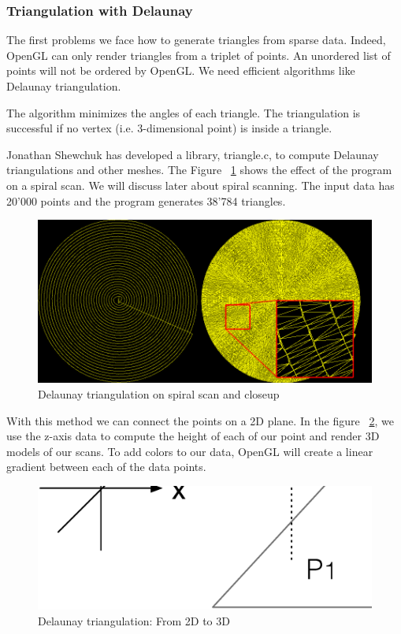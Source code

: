 \subsubsection{Triangulation with Delaunay}

The first problems we face how to generate triangles from sparse data. Indeed, OpenGL can only render triangles from a triplet of points. An unordered list of points will not be ordered by OpenGL. We need efficient algorithms like Delaunay triangulation.

The algorithm minimizes the angles of each triangle. The triangulation is successful if no vertex (i.e. 3-dimensional point) is inside a triangle.

Jonathan Shewchuk \cite{shewchuk96b} has developed a library, triangle.c, to compute Delaunay triangulations and other meshes. The Figure ~\ref{triangulation2d} shows the effect of the program on a spiral scan.  We will discuss later about spiral scanning. The input data has 20'000 points and the program generates 38'784 triangles. 

\begin{figure}[H]
  \centering
  \includegraphics[scale=0.5]{images/triangulation.png}
    \caption{Delaunay triangulation on spiral scan and closeup}
  \label{triangulation2d}
\end{figure}


With this method we can connect the points on a 2D plane. In the figure  ~\ref{triangulation3d}, we use the z-axis data to compute the height of each of our point and render 3D models of our scans. To add colors to our data, OpenGL will create a linear gradient between each of the data points.

\begin{figure}[H]
  \centering
  \includegraphics[scale=0.3]{images/delaunay.eps}
    \caption{Delaunay triangulation: From 2D to 3D}
  \label{triangulation3d}
\end{figure}

